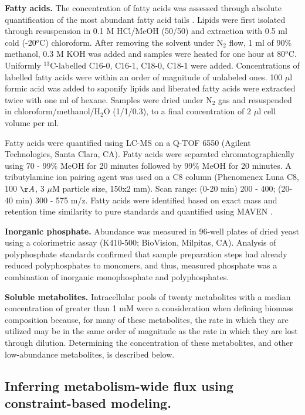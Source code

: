 \textbf{Fatty acids.} The concentration of fatty acids was assessed through absolute quantification of the most abundant fatty acid tails \cite{Pramanik:1997ja}.  Lipids were first isolated through resuspension in 0.1 M HCl/MeOH (50/50) and extraction with 0.5 ml cold (-20$^{o}$C) chloroform.  After removing the solvent under N$_{2}$ flow, 1 ml of 90\% methanol, 0.3 M KOH was added and samples were heated for one hour at 80$^{o}$C.  Uniformly $^{13}$C-labelled C16-0, C16-1, C18-0, C18-1 were added.  Concentrations of labelled fatty acids were within an order of magnitude of unlabeled ones.  100 $\mu$l formic acid was added to saponify lipids and liberated fatty acids were extracted twice with one ml of hexane.  Samples were dried under N$_{2}$ gas and resuspended in chloroform/methanol/H$_{2}$O (1/1/0.3), to a final concentration of 2 $\mu$l cell volume per ml.

Fatty acids were quantified using LC-MS on a Q-TOF 6550 (Agilent Technologies, Santa Clara, CA).  Fatty acids were separated chromatographically using 70 - 99\% MeOH for 20 minutes followed by 99\% MeOH for 20 minutes.  A tributylamine ion pairing agent was used on a C8 column (Phenomenex Luna C8, 100 $\AA$, 3 $\mu$M particle size, 150x2 mm).  Scan range: (0-20 min) 200 - 400; (20-40 min) 300 - 575 m/z.  Fatty acids were identified based on exact mass and retention time similarity to pure standards and quantified using MAVEN \cite{Melamud:2010bp}.  

\textbf{Inorganic phosphate.} Abundance was measured in 96-well plates of dried yeast using a colorimetric assay (K410-500; BioVision, Milpitas, CA).  Analysis of polyphosphate standards confirmed that sample preparation steps had already reduced polyphosphates to monomers, and thus, measured phosphate was a combination of inorganic monophosphate and polyphosphates.

\textbf{Soluble metabolites.} Intracellular pools of twenty metabolites with a median concentration of greater than 1 mM were a consideration when defining biomass composition because, for many of these metabolites, the rate in which they are utilized may be in the same order of magnitude as the rate in which they are lost through dilution.  Determining the concentration of these metabolites, and other low-abundance metabolites, is described below.

\subsection{Inferring metabolism-wide flux using constraint-based modeling.}

